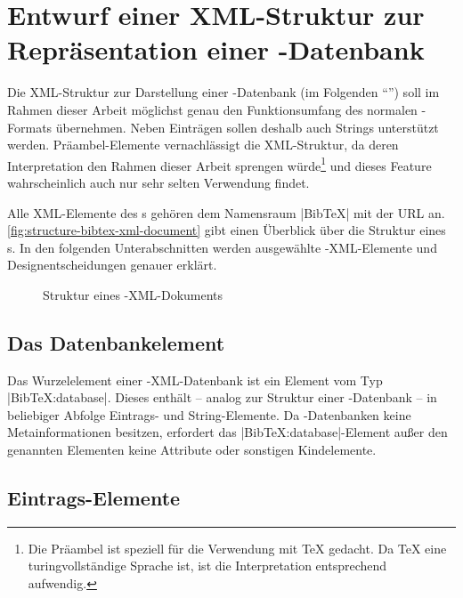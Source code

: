 \section[Entwurf einer XML-Struktur]{Entwurf einer XML-Struktur zur Repräsentation einer \mbox{\BibTeX-}Datenbank}

\def\temp{
    Die Präambel ist speziell für die Verwendung mit \TeX{} gedacht. Da \TeX{}
    eine turingvollständige Sprache ist, ist die Interpretation entsprechend
    aufwendig.
}

Die XML-Struktur zur Darstellung einer \mbox{\BibTeX-}Datenbank (im Folgenden
\enquote{\BibTeXXML}) soll im Rahmen dieser Arbeit möglichst genau den
Funktionsumfang des normalen \mbox{\BibTeX-}Formats übernehmen. Neben Einträgen
sollen deshalb auch Strings unterstützt werden. Präambel-Elemente vernachlässigt
die XML-Struktur, da deren Interpretation den Rahmen dieser Arbeit sprengen
würde\footnote{\temp} und dieses Feature wahrscheinlich auch nur sehr selten
Verwendung findet.

Alle XML-Elemente des \BibTeXXMLformat s gehören dem Namensraum
\lstinlineXML|BibTeX| mit der URL {\ttfamily \BibTeXXMLnamespace} an.
\autoref{fig:structure-bibtex-xml-document} gibt einen Überblick über die
Struktur eines \BibTeXXMLdoc s. In den folgenden Unterabschnitten werden
ausgewählte \mbox{\BibTeX-}XML-Elemente und Designentscheidungen genauer
erklärt.

\begin{figure}
    \centering
    
    \caption{Struktur eines \mbox{\BibTeX-}XML-Dokuments}
    \label{fig:structure-bibtex-xml-document}
\end{figure}

\subsection{Das Datenbankelement}

Das Wurzelelement einer \mbox{\BibTeX}-XML-Datenbank ist ein Element vom Typ
\mbox{\lstinlineXML|BibTeX:database|.} Dieses enthält -- analog zur Struktur
einer \mbox{\BibTeX-}Datenbank -- in beliebiger Abfolge Eintrags- und
String-Elemente. Da \mbox{\BibTeX-}Datenbanken keine Metainformationen besitzen,
erfordert das \mbox{\lstinlineXML|BibTeX:database|-}Element außer den genannten
Elementen keine Attribute oder sonstigen Kindelemente.

\subsection{Eintrags-Elemente}

